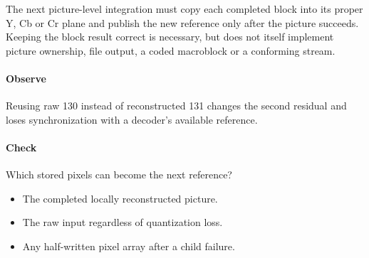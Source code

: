The next picture-level integration must copy each completed block into its proper
Y, Cb or Cr plane and publish the new reference only after the picture succeeds.
Keeping the block result correct is necessary, but does not itself implement
picture ownership, file output, a coded macroblock or a conforming stream.

\paragraph{Observe} Reusing raw 130 instead of reconstructed 131 changes the
second residual and loses synchronization with a decoder's available reference.
\paragraph{Check} Which stored pixels can become the next reference?
\begin{itemize}
  \item[A.] The completed locally reconstructed picture.
  \item[B.] The raw input regardless of quantization loss.
  \item[C.] Any half-written pixel array after a child failure.
\end{itemize}
